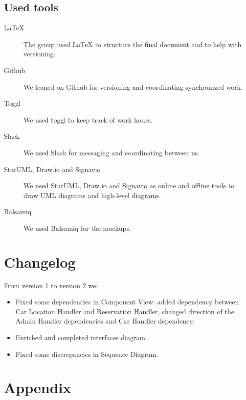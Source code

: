 \documentclass[12pt, a4paper]{article}
\begin{document}
		\subsection{Used tools}
		\begin{description}
			\item [LaTeX] The group used LaTeX to structure the final document and to help with versioning.
			\item [Github] We leaned on Github for versioning and coordinating synchronized work.
			\item [Toggl] We used toggl to keep track of work hours.
			\item [Slack] We used Slack for messaging and coordinating between us.
			\item [StarUML, Draw.io and Signavio] We used StarUML, Draw.io and Signavio as online and offline tools to draw UML diagrams and high-level diagrams.
			\item [Balsamiq] We used Balsamiq for the mockups.
		\end{description}
	
	\section{Changelog}
	From version 1 to version 2 we:
		\begin{itemize}
			\item Fixed some dependencies in Component View: added dependency between Car Location Handler and Reservation Handler, changed direction of the Admin Handler dependencies and Car Handler dependency.
			\item Enriched and completed interfaces diagram.
			\item Fixed some discrepancies in Sequence Diagram.
		\end{itemize}			
	
	\newpage
	\section{Appendix}
	\listoffigures
\end{document}
